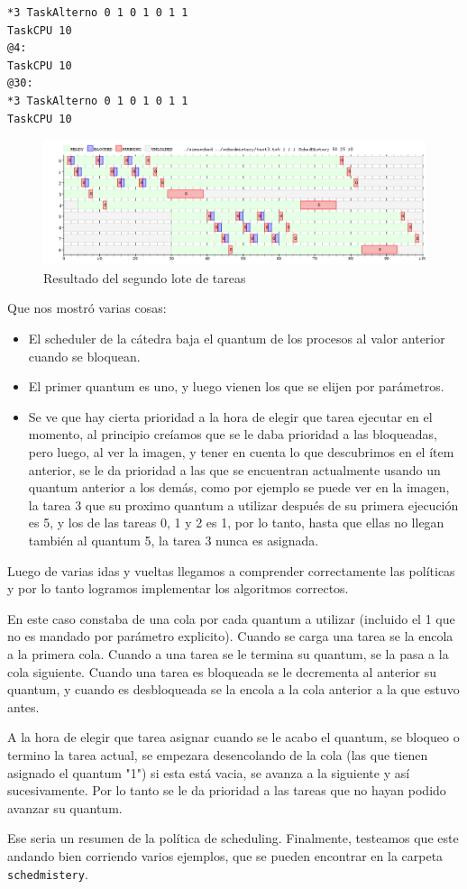 \documentclass{article}
\begin{document}
\begin{verbatim}
*3 TaskAlterno 0 1 0 1 0 1 1
TaskCPU 10
@4:
TaskCPU 10
@30:
*3 TaskAlterno 0 1 0 1 0 1 1
TaskCPU 10
\end{verbatim}

\begin{figure}[h!]
\caption{Resultado del segundo lote de tareas \label{grf:ex7-2}}
\centering
\includegraphics[width=15cm]{../ejercicios/ejercicio 7-3}
\end{figure}

Que nos mostró varias cosas:
\begin{itemize}
\item El scheduler de la cátedra baja el quantum de los procesos al valor anterior cuando se bloquean.
\item El primer quantum es uno, y luego vienen los que se elijen por parámetros.
\item Se ve que hay cierta prioridad a la hora de elegir que tarea ejecutar en el momento, al principio creíamos que se le daba prioridad a las bloqueadas, pero luego, al ver la imagen, y tener en cuenta lo que descubrimos en el ítem anterior, se le da prioridad a las que se encuentran actualmente usando un quantum anterior a los demás, como por ejemplo se puede ver en la imagen, la tarea 3 que su proximo quantum a utilizar después de su primera ejecución es 5, y los de las tareas 0, 1 y 2 es 1, por lo tanto, hasta que ellas no llegan también al quantum 5, la tarea 3 nunca es asignada.
\end{itemize}

Luego de varias idas y vueltas llegamos a comprender correctamente las políticas y por lo tanto logramos implementar los algoritmos correctos.\par
En este caso constaba de una cola por cada quantum a utilizar (incluido el 1 que no es mandado por parámetro explicito). Cuando se carga una tarea se la encola a la primera cola. Cuando a una tarea se le termina su quantum, se la pasa a la cola siguiente. Cuando una tarea es bloqueada se le decrementa al anterior su quantum, y cuando es desbloqueada se la encola a la cola anterior a la que estuvo antes.\par
A la hora de elegir que tarea asignar cuando se le acabo el quantum, se bloqueo o termino la tarea actual, se empezara desencolando de la cola (las que tienen asignado el quantum "1") si esta está vacia, se avanza a la siguiente y así sucesivamente. Por lo tanto se le da prioridad a las tareas que no hayan podido avanzar su quantum.\par
Ese seria un resumen de la política de scheduling.
Finalmente, testeamos que este andando bien corriendo varios ejemplos, que se pueden encontrar en la carpeta \verb`schedmistery`.
\end{document}
